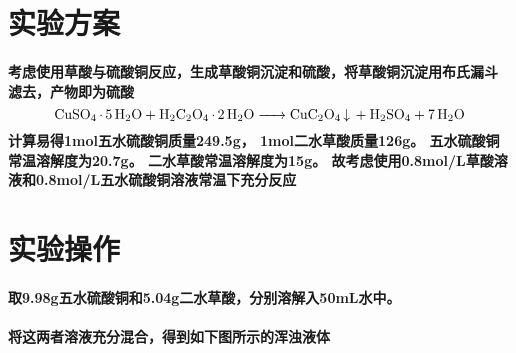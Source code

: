 \documentclass[final,11pt,oneside,UTF8]{report}
\begin{document}
\section{实验方案}
\paragraph{
    考虑使用草酸与硫酸铜反应，生成草酸铜沉淀和硫酸，将草酸铜沉淀用布氏漏斗
    滤去，产物即为硫酸
    $$\ce{CuSO4 * 5H2O + H2C2O4 * 2H2O -> CuC2O4 v + H2SO4 + 7H2O}$$
    计算易得1mol五水硫酸铜质量249.5g，
    1mol二水草酸质量126g。
    五水硫酸铜常温溶解度为20.7g。
    二水草酸常温溶解度为15g。
    故考虑使用0.8mol/L草酸溶液和0.8mol/L五水硫酸铜溶液常温下充分反应
}
\section{实验操作}
\paragraph{
    取9.98g五水硫酸铜和5.04g二水草酸，分别溶解入50mL水中。
}
\paragraph{
    将这两者溶液充分混合，得到如下图所示的浑浊液体
}
\end{document}
